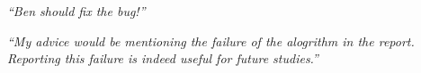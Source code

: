 \documentclass[portrait,11pt]{seminar}
\begin{document}

\medskip


{\it ``Ben should fix the bug!''}

\medskip

{\it ``My advice would be mentioning the failure of the alogrithm in the report. Reporting this failure is indeed useful for future studies.''}







\es
\end{document}
